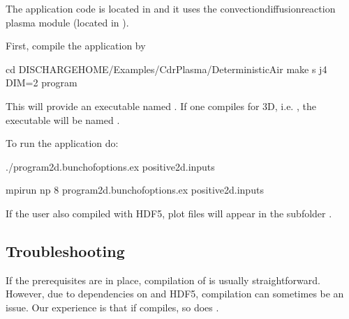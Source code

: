 \documentclass[letterpaper,10pt,english]{sphinxmanual}
\begin{document}
The application code is located in  and it uses the convection\sphinxhyphen{}diffusion\sphinxhyphen{}reaction plasma module (located in ).

First, compile the application by

\begin{sphinxVerbatim}[commandchars=\\\{\},formatcom=\scriptsize]
cd \PYGZdl{}DISCHARGE\PYGZus{}HOME/Examples/CdrPlasma/DeterministicAir
make \PYGZhy{}s \PYGZhy{}j4 DIM=2 program
\end{sphinxVerbatim}

This will provide an executable named .
If one compiles for 3D, i.e. , the executable will be named .

To run the application do:


\begin{sphinxVerbatim}[commandchars=\\\{\},formatcom=\scriptsize]
./program2d.\PYGZlt{}bunch\PYGZus{}of\PYGZus{}options\PYGZgt{}.ex positive2d.inputs
\end{sphinxVerbatim}


\begin{sphinxVerbatim}[commandchars=\\\{\},formatcom=\scriptsize]
mpirun \PYGZhy{}np 8 program2d.\PYGZlt{}bunch\PYGZus{}of\PYGZus{}options\PYGZgt{}.ex positive2d.inputs
\end{sphinxVerbatim}

If the user also compiled with HDF5, plot files will appear in the subfolder .


\subsection{Troubleshooting}
\label{\detokenize{Base/GettingStarted:troubleshooting}}\label{\detokenize{Base/GettingStarted:chap-troubleshooting}}
If the prerequisites are in place, compilation of  is usually straightforward.
However, due to dependencies on  and HDF5, compilation can sometimes be an issue.
Our experience is that if  compiles, so does .
\end{document}
